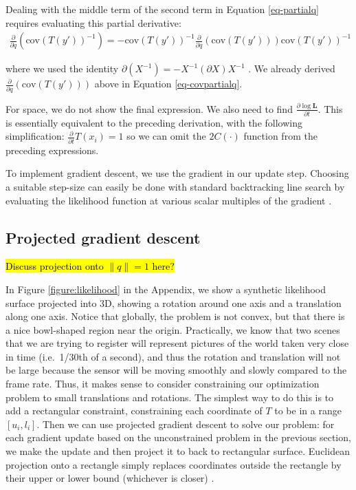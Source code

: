 \documentclass{article} %
\begin{document}
Dealing with the middle term of the second term in Equation \ref{eq-partialq} requires evaluating this partial derivative:
\begin{eqnarray*}
\frac{\partial}{\partial q} \left(\mbox{cov}(T(y'))^{-1}\right) = -\mbox{cov}(T(y'))^{-1} \frac{\partial}{\partial q}\left(\mbox{cov}(T(y'))\right) \mbox{cov}(T(y'))^{-1}
\end{eqnarray*}

where we used the identity $\partial(X^{-1}) = - X^{-1} (\partial X) X^{-1}$ \cite{petersen2008matrix}. We already derived $\frac{\partial}{\partial q} (\mbox{cov}(T(y')))$ above in Equation \ref{eq-covpartialq}.

For space, we do not show the final expression. We also need to find $\frac{\partial \log \mathbf{L}}{\partial t}$. This is essentially
equivalent to the preceding derivation, with the following simplification: $\frac{\partial }{\partial t} T(x_i) = 1$ so we can omit the $2C(\cdot)$ function from the preceding expressions.

To implement gradient descent, we use the gradient in our update step. Choosing a suitable step-size can easily be done with standard backtracking line search by evaluating the likelihood function at various scalar multiples of the gradient \cite[p. 464]{boyd2004convex}.

\subsection{Projected gradient descent}
\hl{Discuss projection onto $\|q\|=1$ here?}

In Figure \ref{figure:likelihood} in the Appendix, we show a synthetic likelihood surface projected into 3D, showing a rotation around one axis and a translation along one axis. Notice that globally, the problem is not convex, but that there is a nice bowl-shaped region near the origin. Practically, we know that two scenes that we are trying to register will represent pictures of the world taken very close in time (i.e.~1/30th of a second), and thus the rotation and translation will not be large because the sensor will be moving smoothly and slowly compared to the frame rate. Thus, it makes sense to consider constraining our optimization problem to small translations and rotations. The simplest way to do this is to add a rectangular constraint, constraining each coordinate of $T$ to be in a range $[u_i,l_i]$. 
Then we can use projected gradient descent to solve our problem: for each gradient update based on the unconstrained problem in the previous section, 
we make the update and then project it to back to rectangular surface. Euclidean projection onto a rectangle simply replaces coordinates outside the rectangle by their upper or lower bound (whichever is closer) \cite[p. 399]{boyd2004convex}.
\end{document}
